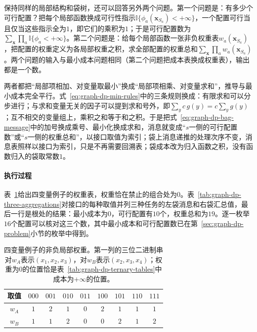 保持同样的局部结构和袋树，还可以回答另外两个问题。第一个问题是：有多少个可行配置？把每个局部函数换成可行性指示$\mathbb I\{\phi_a(\bm x_{S_a})<+\infty\}$，一个配置可行当且仅当这些指示全为$1$，即它们的乘积为$1$；于是可行配置数为$\sum_{\bm x}\prod_a\mathbb I\{\phi_a<+\infty\}$。第二个问题是：给每个局部函数一张非负权重表$w_a(\bm x_{S_a})$，把配置的权重定义为各局部权重之积，求全部配置的权重总和$\sum_{\bm x}\prod_a w_a(\bm x_{S_a})$。两个问题的输入与最小成本问题相同（第二个问题把成本表换成权重表），输出都是一个数。

两者都把“局部项相加、对变量取最小”换成“局部项相乘、对变量求和”，推导与最小成本完全平行。式~\eqref{eq:graph-dp-min-rules}中的三条规则换成：有限求和可以分步进行；与求和变量无关的因子可以提到求和号外，即$\sum_y c\,g(y)=c\sum_y g(y)$；互不相交的变量组上，乘积之和等于和之积。于是把式~\eqref{eq:graph-dp-bag-message}中的加号换成乘号、最小化换成求和，消息就变成“$s$一侧的可行配置数”或“$s$一侧的权重总和”，以接口取值为索引；袋上消息递推的处理次序不变，消息表照样以接口为索引，只是不再需要回溯表；袋成本改为归入函数之积，没有函数归入的袋取常数$1$。

\paragraph{执行过程}
表~\ref{tab:graph-dp-weights}给出四变量例子的权重表，权重恰在禁止的组合处为$0$。表~\ref{tab:graph-dp-three-aggregations}对接口的每种取值并列三种任务的左袋消息和右袋汇总值，最后一行是根处的结果：最小成本为$0$，可行配置有$10$个，权重总和为$19$。逐一枚举$16$个配置可以核对这三个数，其中最小成本和可行配置数已在第~\ref{sec:graph-dp-problem}小节的枚举中得到。

\begin{table}[!htb]
  \centering
  \caption{四变量例子的非负局部权重。第一列的三位二进制串对$w_A$表示$(x_1,x_2,x_3)$，对$w_B$表示$(x_2,x_3,x_4)$；权重为$0$的位置恰是表~\ref{tab:graph-dp-ternary-tables}中成本为$+\infty$的位置。}
  \label{tab:graph-dp-weights}
  \begin{tabular}{ccccccccc}
    \toprule
    取值 & $000$ & $001$ & $010$ & $011$ & $100$ & $101$ & $110$ & $111$\\
    \midrule
    $w_A$ & $1$ & $2$ & $1$ & $0$ & $2$ & $1$ & $1$ & $1$\\
    $w_B$ & $1$ & $1$ & $2$ & $0$ & $0$ & $2$ & $1$ & $2$\\
    \bottomrule
  \end{tabular}
\end{table}

